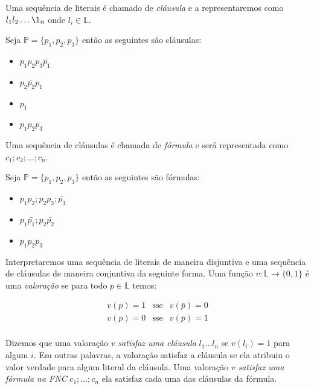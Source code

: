 Uma sequência de literais é chamado de {\em cláusula} e a representaremos como $l_1l_2\dots\l_n$ onde $l_i \in \mathbb{L}$.


\begin{example}
  Seja $\mathbb{P} = \{p_1, p_2, p_3\}$ então as seguintes são cláusulas:
\begin{itemize}
\item[] $p_1p_2p_3\bar{p_1}$
\item[] $p_2\bar{p_2}p_1$
\item[] $p_1$
\item[] $p_1p_2p_3$
\end{itemize}
\end{example}

Uma sequência de cláusulas é chamada de {\em fórmula} e será representada como $c_1;c_2;\dots;c_n$.

\begin{example}
  Seja $\mathbb{P} = \{p_1, p_2, p_3\}$ então as seguintes são fórmulas:
\begin{itemize}
\item[] $p_1p_2;p_2p_3;\bar{p_3}$
\item[] $p_1\bar{p_1};p_2\bar{p_2}$
\item[] $p_1p_2p_3$
\end{itemize}
\end{example}

Interpretaremos uma sequência de literais de maneira disjuntiva e uma sequência de cláusulas de maneira conjuntiva da seguinte forma.
Uma função $v: \mathbb{L} \to \{0,1\}$ é uma {\em valoração} se para todo $p \in \mathbb{L}$ temos:

\begin{eqnarray*}
  v(p) = 1 & \textrm{sse} & v(\bar{p}) = 0\\
  v(p) = 0 & \textrm{sse} & v(\bar{p}) = 1\\
\end{eqnarray*}

Dizemos que uma valoração $v$ {\em satisfaz uma cláusula} $l_1 \dots l_n$ se $v(l_i) = 1$ para algum $i$.
Em outras palavras, a valoração satisfaz a cláusula se ela atribuiu o valor verdade para algum literal da cláusula.
Uma valoração $v$ {\em satisfaz uma fórmula na FNC} $c_1; \dots; c_n$ ela satisfaz cada uma das cláusulas da fórmula.



